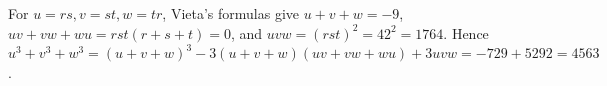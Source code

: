 For $ u=rs,v=st,w=tr $, Vieta's formulas give $ u+v+w=-9 $, $ uv+vw+wu=rst(r+s+t)=0 $, and $ uvw=(rst)^2=42^2=1764 $. Hence $ u^3+v^3+w^3=(u+v+w)^3-3(u+v+w)(uv+vw+wu)+3uvw=-729+5292=\boxed{4563}$.
